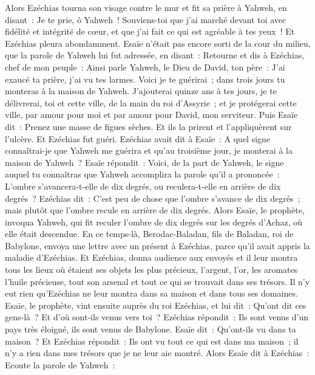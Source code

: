 \begin{multicols}{2}
Alors Ezéchias tourna son visage contre le mur et fit sa prière à Yahweh, en disant~:
Je te prie, ô Yahweh~! Souviens-toi que j'ai marché devant toi avec fidélité et intégrité de cœur, et que j'ai fait ce qui est agréable à tes yeux~! Et Ezéchias pleura abondamment.
Esaïe n'était pas encore sorti de la cour du milieu, que la parole de Yahweh lui fut adressée, en disant~:
Retourne et dis à Ezéchias, chef de mon peuple~: Ainsi parle Yahweh, le Dieu de David, ton père~: J'ai exaucé ta prière, j'ai vu tes larmes. Voici je te guérirai~; dans trois jours tu monteras à la maison de Yahweh.
J'ajouterai quinze ans à tes jours, je te délivrerai, toi et cette ville, de la main du roi d'Assyrie~; et je protégerai cette ville, par amour pour moi et par amour pour David, mon serviteur.
Puis Esaïe dit~: Prenez une masse de figues sèches. Et ils la prirent et l'appliquèrent sur l'ulcère. Et Ezéchias fut guéri.
Ezéchias avait dit à Esaïe~: A quel signe connaîtrai-je que Yahweh me guérira et qu'au troisième jour, je monterai à la maison de Yahweh~?
Esaïe répondit~: Voici, de la part de Yahweh, le signe auquel tu connaîtras que Yahweh accomplira la parole qu'il a prononcée~: L'ombre s'avancera-t-elle de dix degrés, ou reculera-t-elle en arrière de dix degrés~?
Ezéchias dit~: C'est peu de chose que l'ombre s'avance de dix degrés~; mais plutôt que l'ombre recule en arrière de dix degrés.
Alors Esaïe, le prophète, invoqua Yahweh, qui fit reculer l'ombre de dix degrés sur les degrés d'Achaz, où elle était descendue.
En ce temps-là, Berodac-Baladan, fils de Baladan, roi de Babylone, envoya une lettre avec un présent à Ezéchias, parce qu'il avait appris la maladie d'Ezéchias.
Et Ezéchias, donna audience aux envoyés et il leur montra tous les lieux où étaient ses objets les plus précieux, l'argent, l'or, les aromates l'huile précieuse, tout son arsenal et tout ce qui se trouvait dans ses trésors. Il n'y eut rien qu'Ezéchias ne leur montra dans sa maison et dans tous ses domaines.
Esaïe, le prophète, vint ensuite auprès du roi Ezéchias, et lui dit~: Qu'ont dit ces gens-là~? Et d'où sont-ils venus vers toi~? Ezéchias répondit~: Ils sont venus d'un pays très éloigné, ils sont venus de Babylone.
Esaïe dit~: Qu'ont-ils vu dans ta maison~? Et Ezéchias répondit~: Ils ont vu tout ce qui est dans ma maison~; il n'y a rien dans mes trésors que je ne leur aie montré.
Alors Esaïe dit à Ezéchias~: Ecoute la parole de Yahweh~:

\end{multicols}
